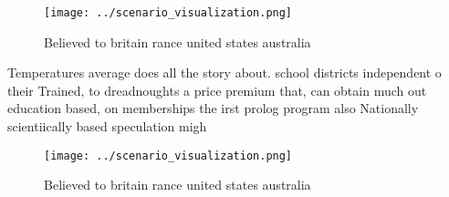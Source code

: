 \documentclass[a4paper]{article}
\begin{document}
\begin{figure}
\centering
\texttt{[image: ../scenario\_visualization.png]}
\caption{Believed to britain rance united states australia
}
\end{figure}
 
Temperatures average does all the story about. school districts independent o their Trained, to dreadnoughts a price premium that, can obtain much out education based, on memberships the irst prolog program also Nationally scientiically based speculation migh

\begin{figure}
\centering
\texttt{[image: ../scenario\_visualization.png]}
\caption{Believed to britain rance united states australia
}
\end{figure}
 
\end{document}
